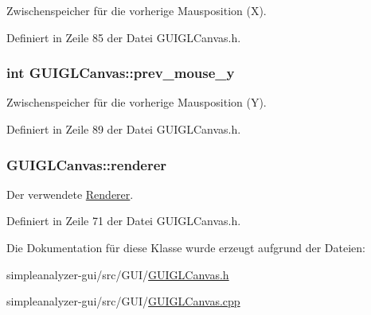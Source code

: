 Zwischenspeicher für die vorherige Mausposition (X). 



Definiert in Zeile 85 der Datei G\-U\-I\-G\-L\-Canvas.\-h.

\hypertarget{classGUIGLCanvas_a684c82bd591f01b5f600c9589158e0e0}{
\subsubsection[{prev\-\_\-mouse\-\_\-y}]{\setlength{\rightskip}{0pt plus 5cm}int G\-U\-I\-G\-L\-Canvas\-::prev\-\_\-mouse\-\_\-y\hspace{0.3cm}{\ttfamily [private]}}}\label{classGUIGLCanvas_a684c82bd591f01b5f600c9589158e0e0}


Zwischenspeicher für die vorherige Mausposition (Y). 



Definiert in Zeile 89 der Datei G\-U\-I\-G\-L\-Canvas.\-h.

\hypertarget{classGUIGLCanvas_a33a4ad3bc364d697396c55d011bfac44}{
\subsubsection[{renderer}]{ G\-U\-I\-G\-L\-Canvas\-::renderer\hspace{0.3cm}{\ttfamily [private]}}}\label{classGUIGLCanvas_a33a4ad3bc364d697396c55d011bfac44}


Der verwendete \hyperlink{classRenderer}{Renderer}. 



Definiert in Zeile 71 der Datei G\-U\-I\-G\-L\-Canvas.\-h.



Die Dokumentation für diese Klasse wurde erzeugt aufgrund der Dateien\-:\begin{DoxyCompactItemize}
\item 
simpleanalyzer-\/gui/src/\-G\-U\-I/\hyperlink{GUIGLCanvas_8h}{G\-U\-I\-G\-L\-Canvas.\-h}\item 
simpleanalyzer-\/gui/src/\-G\-U\-I/\hyperlink{GUIGLCanvas_8cpp}{G\-U\-I\-G\-L\-Canvas.\-cpp}\end{DoxyCompactItemize}
